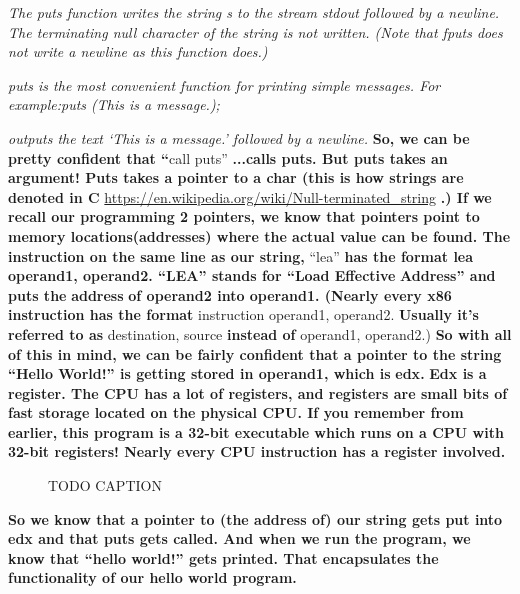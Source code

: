 \documentclass[letterpaper]{article}
\newcommand{\sitfig}[3]{
\begin{figure}[H]
\centering
\makebox[\textwidth][c]{
#2
}
\caption{#3}
\label{#1}
\end{figure}
}
\newcommand{\sitgfx}[4][scale=1.0]{
\sitfig{#3}{\texttt{[image: \#2]}}{#4}
}
\begin{document}
\textit{The puts function writes the string s to the stream stdout followed by a newline. The terminating null character
of the string is not written. (Note that fputs does not write a newline as this function does.)}

\textit{puts is the most convenient function for printing simple messages. \newline
For example:puts ({\textquotedbl}This is a message.{\textquotedbl});}

\textit{outputs the text `This is a message.' followed by a newline.\newline
\newline
}\textbf{So, we can be pretty confident that ``}call puts'' \textbf{...calls puts. But puts takes an argument! Puts
takes a pointer to a char (this is how strings are denoted in C
}\url{https://en.wikipedia.org/wiki/Null-terminated_string}\textbf{ .) If we recall our programming 2 pointers, we know
that pointers point to memory locations(}\textbf{\textcolor[rgb]{0.21960784,0.4627451,0.11372549}{addresses}}\textbf{)
where the actual value can be found. \newline
The instruction on the same line as our string, }{}``lea''\textbf{ has the format lea operand1, operand2. ``LEA'' stands
for ``Load Effective }\textbf{\textcolor[rgb]{0.21960784,0.4627451,0.11372549}{Address}}\textbf{{}'' and puts the
}\textbf{\textcolor[rgb]{0.21960784,0.4627451,0.11372549}{address}}\textbf{ of operand2 into operand1. (Nearly every
x86 instruction has the format }instruction operand1, operand2. \textbf{Usually it's referred to as }destination,
source\textbf{ instead of }operand1, operand2.)\textbf{  \newline
So with all of this in mind, we can be fairly confident that a pointer to the string ``Hello World!'' is getting stored
in operand1, which is }\textbf{\textcolor[rgb]{0.21960784,0.4627451,0.11372549}{edx}}\textbf{.
}\textbf{\textcolor[rgb]{0.21960784,0.4627451,0.11372549}{Edx }}\textbf{is a
}\textbf{\textcolor[rgb]{0.21960784,0.4627451,0.11372549}{register}}\textbf{. The CPU has a lot of registers, and
registers are small bits of fast storage located on the physical CPU. If you remember from earlier, this program is a
32-bit executable which runs on a CPU with 32-bit registers! Nearly every CPU instruction has a register involved.}

{\centering
  
\sitgfx[width=1.9583in,height=1.8752in]{FINALWORKINGDOCFORMERLYPRECURSOR-img011.png}{fig:unk}{TODO CAPTION}
 \par}
\textbf{So we know that a pointer to (the address of) our string gets put into edx and that puts gets called. And when
we run the program, we know that ``hello world!'' gets printed. That encapsulates the functionality of our hello world
program. }
\end{document}
